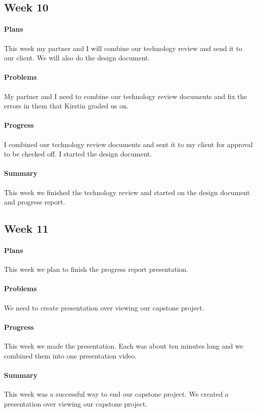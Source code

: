 \documentclass{article}
\begin{document}
\subsection{Week 10}
\paragraph{Plans}
This week my partner and I will combine our technology review and send it to our client. We will also do the design document. 
\paragraph{Problems}
My partner and I need to combine our technology review documents and fix the errors in them that Kirstin graded us on.
\paragraph{Progress}
I combined our technology review documents and sent it to my client for approval to be checked off. I started the design document. 
\paragraph{Summary}
This week we finished the technology review and started on the design document and progress report. 
\subsection{Week 11}
\paragraph{Plans}
This week we plan to finish the progress report presentation.
\paragraph{Problems}
We need to create presentation over viewing our capstone project. 
\paragraph{Progress}
This week we made the presentation. Each was about ten minutes long and we combined them into one presentation video.
\paragraph{Summary}
This week was a successful way to end our capstone project. We created a presentation over viewing our capstone project. 
\end{document}
